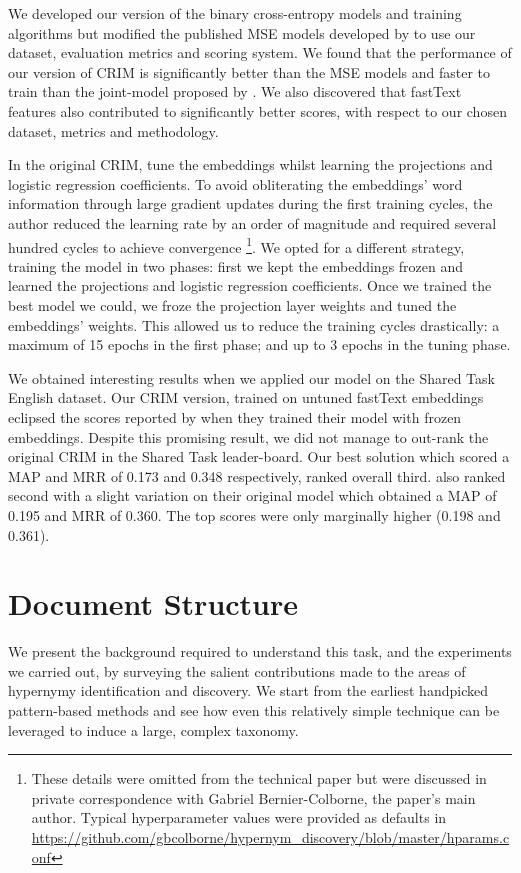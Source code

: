 We developed our version of the binary cross-entropy models and training algorithms but modified the published \ac{MSE} models developed by \citeauthor{ustalov2017negative} to use our dataset, evaluation metrics and scoring system.  We found that the performance of our version of CRIM is significantly better than the \ac{MSE} models and faster to train than the joint-model proposed by \citet{yamane2016distributional}.  We also discovered that fastText features also contributed to significantly better scores, with respect to our chosen dataset, metrics and methodology.

In the original CRIM, \citet{bernier2018crim} tune the embeddings whilst learning the projections and logistic regression coefficients.  To avoid obliterating the embeddings' word information through large gradient updates during the first training cycles, the author reduced the learning rate by an order of magnitude and required several hundred cycles to achieve convergence \footnote{These details were omitted from the technical paper but were discussed in private correspondence with Gabriel Bernier-Colborne, the paper's main author.  Typical hyperparameter values were provided as defaults in \url{https://github.com/gbcolborne/hypernym_discovery/blob/master/hparams.conf}}.  We opted for a different strategy, training the model in two phases: first we kept the embeddings frozen and learned the projections and logistic regression coefficients.  Once we trained the best model we could, we froze the projection layer weights and tuned the embeddings' weights.  This allowed us to reduce the training cycles drastically: a maximum of 15 epochs in the first phase; and up to 3 epochs in the tuning phase.  

We obtained interesting results when we applied our model on the Shared Task English dataset. Our CRIM version, trained on untuned fastText embeddings eclipsed the scores reported by \citet{bernier2018crim} when they trained their model with frozen embeddings.  Despite this promising result, we did not manage to out-rank the original CRIM in the Shared Task leader-board.  Our best solution which scored a \ac{MAP} and \ac{MRR} of 0.173 and 0.348 respectively, ranked overall third.
\citeauthor{bernier2018crim} also ranked second with a slight variation on their original model which obtained a \ac{MAP} of 0.195 and \ac{MRR} of 0.360.  The top scores were only marginally higher (0.198 and 0.361).

\section{Document Structure}
We present the background required to understand this task, and the experiments we carried out, by surveying the salient contributions made to the areas of hypernymy identification and discovery.   We start from the earliest handpicked pattern-based methods and see how even this relatively simple technique can be leveraged to induce a large, complex taxonomy.  

